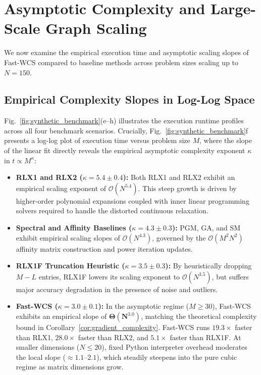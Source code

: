 \documentclass[conference]{IEEEtran}
\begin{document}

\section{Asymptotic Complexity and Large-Scale Graph Scaling}
\label{sec:scaling_benchmark}

We now examine the empirical execution time and asymptotic scaling slopes of Fast-WCS compared to baseline methods across problem sizes scaling up to $N = 150$.

\subsection{Empirical Complexity Slopes in Log-Log Space}

Fig.~\ref{fig:synthetic_benchmark}(e--h) illustrates the execution runtime profiles across all four benchmark scenarios. Crucially, Fig.~\ref{fig:synthetic_benchmark}f presents a log-log plot of execution time versus problem size $M$, where the slope of the linear fit directly reveals the empirical asymptotic complexity exponent $\kappa$ in $t \propto M^\kappa$:

\begin{itemize}
    \item \textbf{RLX1 and RLX2 ($\kappa = 5.4 \pm 0.4$):} Both RLX1 and RLX2 exhibit an empirical scaling exponent of $\mathcal{O}(N^{5.4})$. This steep growth is driven by higher-order polynomial expansions coupled with inner linear programming solvers required to handle the distorted continuous relaxation.
    \item \textbf{Spectral and Affinity Baselines ($\kappa = 4.3 \pm 0.3$):} PGM, GA, and SM exhibit empirical scaling slopes of $\mathcal{O}(N^{4.3})$, governed by the $\mathcal{O}(M^2 N^2)$ affinity matrix construction and power iteration updates.
    \item \textbf{RLX1F Truncation Heuristic ($\kappa = 3.5 \pm 0.3$):} By heuristically dropping $M - L$ entries, RLX1F lowers its scaling exponent to $\mathcal{O}(N^{3.5})$, but suffers major accuracy degradation in the presence of noise and outliers.
    \item \textbf{Fast-WCS ($\kappa = 3.0 \pm 0.1$):} In the asymptotic regime ($M \ge 30$), Fast-WCS exhibits an empirical slope of $\mathbf{\Theta(N^{3.0})}$, matching the theoretical complexity bound in Corollary~\ref{cor:gradient_complexity}. Fast-WCS runs $19.3\times$ faster than RLX1, $28.0\times$ faster than RLX2, and $5.1\times$ faster than RLX1F. At smaller dimensions ($N \le 20$), fixed Python interpreter overhead moderates the local slope ($\approx 1.1\text{--}2.1$), which steadily steepens into the pure cubic regime as matrix dimensions grow.
\end{itemize}
\end{document}

